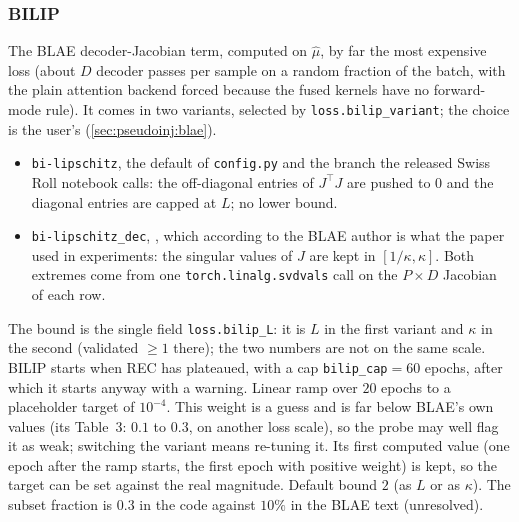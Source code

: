 \subsubsection{BILIP}
The BLAE decoder-Jacobian term, computed on $\hat\mu$, by far the most expensive loss
(about $D$ decoder passes per sample on a random fraction of the batch, with the plain
attention backend forced because the fused kernels have no forward-mode rule). It comes
in two variants, selected by \texttt{loss.bilip\_variant}; the choice is the user's
(\cref{sec:pseudoinj:blae}).
\begin{itemize}[leftmargin=1.5em]
\item \texttt{bi-lipschitz}, the default of \texttt{config.py} and the branch the
      released Swiss Roll notebook calls: the off-diagonal entries of $J^\top J$ are
      pushed to $0$ and the diagonal entries are capped at $L$; no lower bound.
\item \texttt{bi-lipschitz\_dec}, \cite[Eq.~(12)]{zhan2026blae}, which according to the
      BLAE author is what the paper used in experiments: the singular values of $J$ are kept in
      $[1/\kappa,\kappa]$. Both extremes come from one \texttt{torch.linalg.svdvals}
      call on the $P\times D$ Jacobian of each row.
\end{itemize}
The bound is the single field \texttt{loss.bilip\_L}: it is $L$ in the first variant
and $\kappa$ in the second (validated $\ge1$ there); the two numbers are not on the
same scale. BILIP starts when REC has plateaued, with a cap
\texttt{bilip\_cap}$=60$ epochs, after which it starts anyway with a warning. Linear
ramp over $20$ epochs to a placeholder target of $10^{-4}$. This weight is a guess and
is far below BLAE's own values (its Table~3: $0.1$ to $0.3$, on another loss scale), so
the probe may well flag it as weak; switching the variant means re-tuning it. Its first
computed value (one epoch after the ramp starts, the first epoch with positive weight)
is kept, so the target can be set against the real magnitude. Default bound $2$ (as $L$
or as $\kappa$). The subset fraction is $0.3$ in the code against $10\%$ in the BLAE
text (unresolved).

